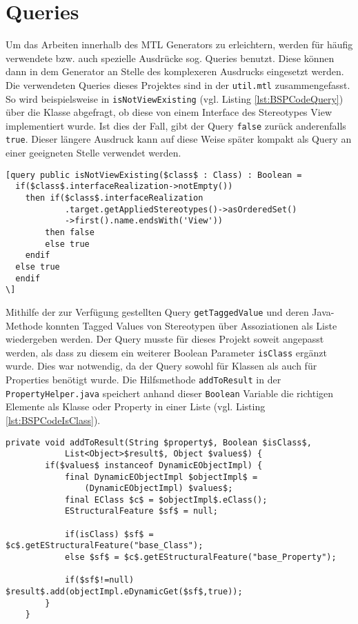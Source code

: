 \section{Queries} \label{Queries}
Um das Arbeiten innerhalb des MTL Generators zu erleichtern, werden für häufig verwendete bzw. auch spezielle Ausdrücke sog. Queries benutzt. Diese können dann in dem Generator an Stelle des komplexeren Ausdrucks eingesetzt werden. Die verwendeten Queries dieses Projektes sind in der \texttt{util.mtl} zusammengefasst. So wird beispielsweise in \texttt{isNotViewExisting} (vgl. Listing \ref{lst:BSPCodeQuery}) über die Klasse abgefragt, ob diese von einem Interface des Stereotypes View implementiert wurde. Ist dies der Fall, gibt der Query \texttt{false} zurück anderenfalls \texttt{true}. Dieser längere Ausdruck kann auf diese Weise später kompakt als Query an einer geeigneten Stelle verwendet werden.

\lstset{language=mtl}
\begin{lstlisting}[caption={Query für \texttt{isNotViewExisting}}, label={lst:BSPCodeQuery}]
[query public isNotViewExisting($class$ : Class) : Boolean = 
  if($class$.interfaceRealization->notEmpty())
	then if($class$.interfaceRealization
			.target.getAppliedStereotypes()->asOrderedSet()
			->first().name.endsWith('View')) 
		then false 
		else true 
    endif 
  else true 
  endif
\]
\end{lstlisting}

Mithilfe der zur Verfügung gestellten Query \texttt{getTaggedValue} und deren Java-Methode konnten Tagged Values von Stereotypen über Assoziationen als Liste wiedergeben werden. Der Query musste für dieses Projekt soweit angepasst werden, als dass zu diesem ein weiterer Boolean Parameter \texttt{isClass} ergänzt wurde. Dies war notwendig, da der Query sowohl für Klassen als auch für Properties benötigt wurde.
Die Hilfsmethode \texttt{addToResult} in der \texttt{PropertyHelper.java} speichert anhand dieser \texttt{Boolean} Variable die richtigen Elemente als Klasse oder Property in einer Liste (vgl. Listing \ref{lst:BSPCodeIsClass}).
\lstset{language=gwt}
\begin{lstlisting}[caption={Hilfsmethode \texttt{addToResult} der \texttt{PropertyHelper.java}}, label={lst:BSPCodeIsClass}]
private void addToResult(String $property$, Boolean $isClass$,
			List<Object>$result$, Object $values$) {
		if($values$ instanceof DynamicEObjectImpl) {
			final DynamicEObjectImpl $objectImpl$ = 
				(DynamicEObjectImpl) $values$;
			final EClass $c$ = $objectImpl$.eClass();
			EStructuralFeature $sf$ = null;

			if(isClass) $sf$ = $c$.getEStructuralFeature("base_Class");
			else $sf$ = $c$.getEStructuralFeature("base_Property");

			if($sf$!=null) $result$.add(objectImpl.eDynamicGet($sf$,true));
		}
	}
\end{lstlisting}